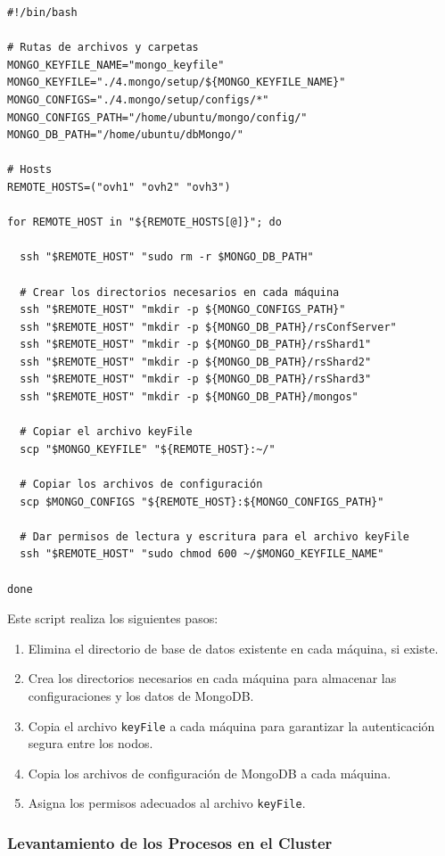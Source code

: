 \begin{verbatim}
#!/bin/bash

# Rutas de archivos y carpetas
MONGO_KEYFILE_NAME="mongo_keyfile"
MONGO_KEYFILE="./4.mongo/setup/${MONGO_KEYFILE_NAME}"
MONGO_CONFIGS="./4.mongo/setup/configs/*"
MONGO_CONFIGS_PATH="/home/ubuntu/mongo/config/"
MONGO_DB_PATH="/home/ubuntu/dbMongo/"

# Hosts
REMOTE_HOSTS=("ovh1" "ovh2" "ovh3")

for REMOTE_HOST in "${REMOTE_HOSTS[@]}"; do

  ssh "$REMOTE_HOST" "sudo rm -r $MONGO_DB_PATH"

  # Crear los directorios necesarios en cada máquina
  ssh "$REMOTE_HOST" "mkdir -p ${MONGO_CONFIGS_PATH}"
  ssh "$REMOTE_HOST" "mkdir -p ${MONGO_DB_PATH}/rsConfServer"
  ssh "$REMOTE_HOST" "mkdir -p ${MONGO_DB_PATH}/rsShard1"
  ssh "$REMOTE_HOST" "mkdir -p ${MONGO_DB_PATH}/rsShard2"
  ssh "$REMOTE_HOST" "mkdir -p ${MONGO_DB_PATH}/rsShard3"
  ssh "$REMOTE_HOST" "mkdir -p ${MONGO_DB_PATH}/mongos"

  # Copiar el archivo keyFile
  scp "$MONGO_KEYFILE" "${REMOTE_HOST}:~/"

  # Copiar los archivos de configuración
  scp $MONGO_CONFIGS "${REMOTE_HOST}:${MONGO_CONFIGS_PATH}"

  # Dar permisos de lectura y escritura para el archivo keyFile
  ssh "$REMOTE_HOST" "sudo chmod 600 ~/$MONGO_KEYFILE_NAME"

done
\end{verbatim}

\noindent Este script realiza los siguientes pasos:
\begin{enumerate}
    \item Elimina el directorio de base de datos existente en cada máquina, si existe.
    \item Crea los directorios necesarios en cada máquina para almacenar las configuraciones y los datos de MongoDB.
    \item Copia el archivo \texttt{keyFile} a cada máquina para garantizar la autenticación segura entre los nodos.
    \item Copia los archivos de configuración de MongoDB a cada máquina.
    \item Asigna los permisos adecuados al archivo \texttt{keyFile}.
\end{enumerate}

\subsubsection*{Levantamiento de los Procesos en el Cluster}

